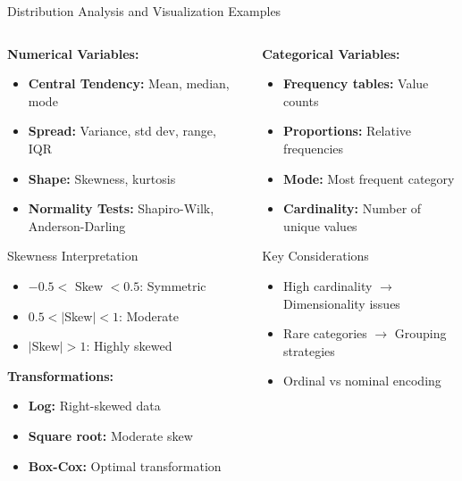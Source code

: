 \documentclass[8pt,aspectratio=1610]{beamer}
\begin{document}
\begin{frame}{Distribution Analysis and Visualization Examples}
\begin{columns}[t]
\begin{column}{0.48\textwidth}
\textbf{Numerical Variables:}
\begin{itemize}
\setlength{\itemsep}{1pt}
\item \textbf{Central Tendency:} Mean, median, mode
\item \textbf{Spread:} Variance, std dev, range, IQR
\item \textbf{Shape:} Skewness, kurtosis
\item \textbf{Normality Tests:} Shapiro-Wilk, Anderson-Darling
\end{itemize}

\vspace{0.3cm}
\begin{block}{Skewness Interpretation}
\begin{itemize}
\setlength{\itemsep}{1pt}
\item $-0.5 < $ Skew $ < 0.5$: Symmetric
\item $0.5 < |$Skew$| < 1$: Moderate
\item $|$Skew$| > 1$: Highly skewed
\end{itemize}
\end{block}

\textbf{Transformations:}
\begin{itemize}
\setlength{\itemsep}{1pt}
\item \textbf{Log:} Right-skewed data
\item \textbf{Square root:} Moderate skew
\item \textbf{Box-Cox:} Optimal transformation
\end{itemize}
\end{column}

\begin{column}{0.48\textwidth}
\textbf{Categorical Variables:}
\begin{itemize}
\setlength{\itemsep}{1pt}
\item \textbf{Frequency tables:} Value counts
\item \textbf{Proportions:} Relative frequencies
\item \textbf{Mode:} Most frequent category
\item \textbf{Cardinality:} Number of unique values
\end{itemize}

\vspace{0.3cm}
\begin{block}{Key Considerations}
\begin{itemize}
\setlength{\itemsep}{1pt}
\item High cardinality $\rightarrow$ Dimensionality issues
\item Rare categories $\rightarrow$ Grouping strategies
\item Ordinal vs nominal encoding
\end{itemize}
\end{block}


\end{column}
\end{columns}
\end{frame}
\end{document}
